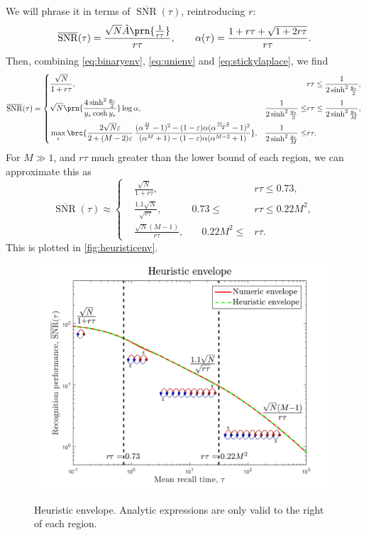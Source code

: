 \documentclass[12pt]{article}
\DeclareMathOperator{\snr}{SNR}
\newcommand{\snrb}{\overline{\snr}}
\begin{document}
We will phrase it in terms of $\snrb(\tau)$, reintroducing $r$:
%
\begin{equation}\label{eq:envunits}
  \snrb(\tau) = \frac{ \sqrt{N} \hat{A}\prn{\frac{1}{r\tau}} }{ r\tau },
  \qquad
  \alpha(\tau) = \frac{ 1 + r\tau +\sqrt{1+2r\tau} }{ r\tau }.
\end{equation}
%
Then, combining \eqref{eq:binaryenv}, \eqref{eq:unienv} and \eqref{eq:stickylaplace}, we find
%
\begin{equation}\label{eq:henv}
  \snrb(\tau) = \left\{
\begin{aligned}
  & \frac{\sqrt{N}}{1+r\tau}, & 
  & r\tau \leq \frac{1}{2\sinh^2\frac{y_*}{2}} , \\
  & \sqrt{N}\prn{ \frac{ 4\sinh^2 \frac{y_*}{2} }{ y_* \cosh y_* } } \log\alpha, & 
  \frac{1}{2\sinh^2 \frac{y_*}{2}} \leq & r\tau \leq \frac{1}{2\sinh^2 \frac{y_*}{M}} , \\
  & \max_\varepsilon \brc{\frac{2\sqrt{N}\varepsilon}{2+(M-2)\varepsilon} \,
      \frac{ (\alpha^{\frac{M}{2}}-1)^2 - (1-\varepsilon)\alpha(\alpha^{\frac{M-2}{2}}-1)^2 }{ (\alpha^M + 1) - (1-\varepsilon)\alpha(\alpha^{M-2}+1) }}, &
  \frac{1}{2\sinh^2 \frac{y_*}{M}} \leq & r\tau .
\end{aligned}
\right.
\end{equation}
%
For $M \gg 1$, and $r\tau$ much greater than the lower bound of each region, we can approximate this as 
%
\begin{equation}\label{eq:henvapproc}
  \snrb(\tau) \approx \left\{
\begin{aligned}
  & \frac{\sqrt{N}}{1+r\tau}, &
  & r\tau \leq 0.73 , \\
  & \frac{ 1.1\sqrt{N}}{ \sqrt{r\tau} } , &
  0.73 \leq & r\tau \leq 0.22 M^2 , \\
  & \frac{ \sqrt{N} (M-1) }{ r\tau }, &\quad
  0.22 M^2 \leq &r\tau .
\end{aligned}
\right.
\end{equation}
%
This is plotted in \autoref{fig:heuristicenv}.



\begin{figure}[tb]
  \centering
  \includegraphics[width=0.8\linewidth]{LenvHeuristic.svg}\\
  \caption[Heuristic envelope]{Heuristic envelope.
  Analytic expressions are only valid to the right of each region.}\label{fig:heuristicenv}
\end{figure}
\end{document}
